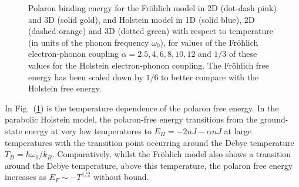 \begin{figure}[!tbp]
    \caption{Polaron binding energy for the Fr\"ohlich model in 2D (dot-dash pink) and 3D (solid gold), and Holstein model in 1D (solid blue), 2D (dashed orange) and 3D (dotted green) with respect to temperature (in units of the phonon frequency $\omega_0$), for values of the Fr\"ohlich electron-phonon coupling $\alpha = 2.5, 4, 6, 8, 10, 12$ and $1/3$ of these values for the Holstein electron-phonon coupling. The Fr\"ohlich free energy has been scaled down by $1/6$ to better compare with the Holstein free energy.}
    \label{fig:energy_temp}
\end{figure}

In Fig.~(\ref{fig:energy_temp}) is the temperature dependence of the polaron free energy. In the parabolic Holstein model, the polaron-free energy transitions from the ground-state energy at very low temperatures to  $E_H = -2nJ - \alpha n J$ at large temperatures with the transition point occurring around the Debye temperature $T_D = \hbar\omega_0/k_B$. Comparatively, whilst the Fr\"ohlich model also shows a transition around the Debye temperature, above this temperature, the polaron free energy increases as $E_F \sim -T^{1/2}$ without bound.




